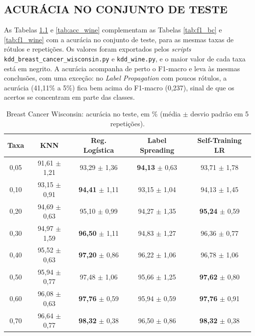 \begin{apendicesenv}

\chapter{ACURÁCIA NO CONJUNTO DE TESTE}
\label{ap:acuracia}

As Tabelas \ref{tab:acc_bc} e \ref{tab:acc_wine} complementam as Tabelas \ref{tab:f1_bc} e \ref{tab:f1_wine} com a acurácia no conjunto de teste, para as mesmas taxas de rótulos e repetições. Os valores foram exportados pelos \textit{scripts} \texttt{kdd\_breast\_cancer\_wisconsin.py} e \texttt{kdd\_wine.py}, e o maior valor de cada taxa está em negrito. A acurácia acompanha de perto o F1-macro e leva às mesmas conclusões, com uma exceção: no \textit{Label Propagation} com poucos rótulos, a acurácia (41,11\% a 5\%) fica bem acima do F1-macro (0,237), sinal de que os acertos se concentram em parte das classes.

\begin{table}[htbp]
\centering
\caption{Breast Cancer Wisconsin: acurácia no teste, em \% (média $\pm$ desvio padrão em 5 repetições).}
\label{tab:acc_bc}
\footnotesize
\setlength{\tabcolsep}{5pt}
\begin{tabular}{ccccc}
\toprule
\textbf{Taxa} & \textbf{KNN} & \textbf{Reg. Logística} & \textbf{Label Spreading} & \textbf{Self-Training LR} \\
\midrule
0,05 & 91,61 $\pm$ 1,21 & 93,29 $\pm$ 1,36 & \textbf{94,13} $\pm$ 0,63 & 93,71 $\pm$ 1,78 \\
0,10 & 93,15 $\pm$ 0,91 & \textbf{94,41} $\pm$ 1,11 & 93,15 $\pm$ 1,04 & 94,13 $\pm$ 1,45 \\
0,20 & 94,69 $\pm$ 0,63 & 95,10 $\pm$ 0,99 & 94,27 $\pm$ 1,35 & \textbf{95,24} $\pm$ 0,59 \\
0,30 & 94,97 $\pm$ 1,59 & \textbf{96,50} $\pm$ 1,11 & 94,83 $\pm$ 1,27 & 96,36 $\pm$ 0,77 \\
0,40 & 95,52 $\pm$ 0,63 & \textbf{97,20} $\pm$ 0,86 & 96,22 $\pm$ 1,06 & 96,78 $\pm$ 1,06 \\
0,50 & 95,94 $\pm$ 0,77 & 97,48 $\pm$ 1,06 & 95,66 $\pm$ 1,25 & \textbf{97,62} $\pm$ 0,80 \\
0,60 & 96,08 $\pm$ 0,63 & \textbf{97,76} $\pm$ 0,59 & 95,94 $\pm$ 0,59 & \textbf{97,76} $\pm$ 0,91 \\
0,70 & 96,64 $\pm$ 0,77 & \textbf{98,32} $\pm$ 0,38 & 96,50 $\pm$ 0,86 & \textbf{98,32} $\pm$ 0,38 \\
\bottomrule
\end{tabular}
\end{table}


\end{apendicesenv}
